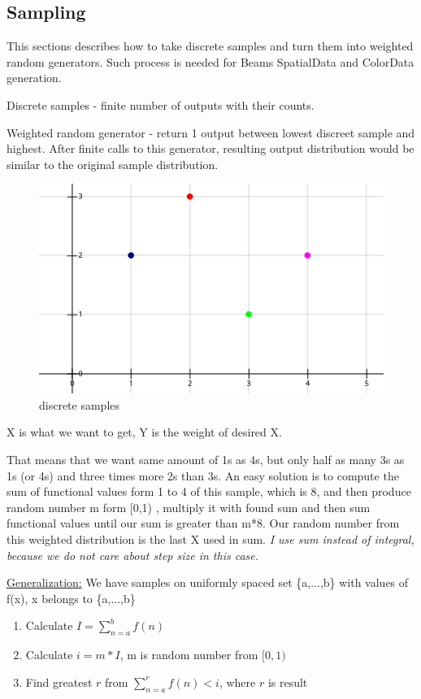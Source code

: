 \documentclass[12pt, letterpaper]{article}
\begin{document}
\subsection{Sampling}
This sections describes how to take discrete samples and turn them into weighted random generators. Such process is needed for Beams SpatialData and ColorData generation. 

Discrete samples - finite number of outputs with their counts. 

Weighted random generator - return 1 output between lowest discreet sample and highest. After finite calls to this generator, resulting output distribution would be similar to the original sample distribution.
\begin{figure}[H]
\centering 
\includegraphics[scale=0.8]{Samples.png}
\caption{discrete samples}
\end{figure}

X is what we want to get, Y is the weight of desired X.

That means that we want same amount of 1s as 4s, but only half as many 3s as 1s (or 4s) and three times more 2s than 3s. 
An easy solution is to compute the sum of functional values  form 1 to 4 of this sample, which is 8, and then produce random number m form [0,1) , multiply it with found sum and then  sum  functional values until our sum is greater than m*8. Our random number from this weighted distribution is the last X used in sum. \textit{I use sum instead of integral, because we do not care about step size in this case.}

\underline{Generalization:} 
We have samples on uniformly spaced set \{a,...,b\}  with values of f(x), x belongs to \{a,...,b\}
\begin{enumerate}
\item Calculate $I = \sum_{n=a}^{b}f(n)$
\item Calculate $i = m*I$, m is random number from $[0,1)$
\item Find greatest $r$ from $\sum_{n=a}^{r}f(n) < i$, where $r$ is result
\end{enumerate}
\end{document}

